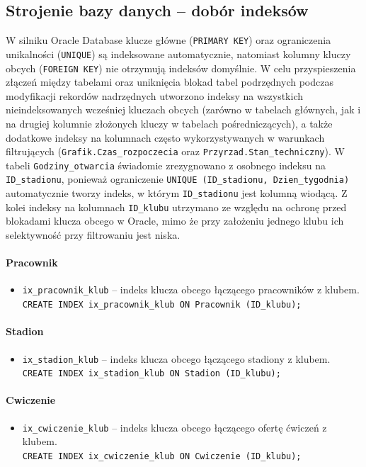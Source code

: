 \documentclass[11pt,a4paper]{article}
\begin{document}
\subsection{Strojenie bazy danych -- dobór indeksów}
W silniku Oracle Database klucze główne (\texttt{PRIMARY KEY}) oraz ograniczenia unikalności (\texttt{UNIQUE}) są indeksowane automatycznie, natomiast kolumny kluczy obcych (\texttt{FOREIGN KEY}) nie otrzymują indeksów domyślnie. W celu przyspieszenia złączeń między tabelami oraz uniknięcia blokad tabel podrzędnych podczas modyfikacji rekordów nadrzędnych utworzono indeksy na wszystkich nieindeksowanych wcześniej kluczach obcych (zarówno w tabelach głównych, jak i na drugiej kolumnie złożonych kluczy w tabelach pośredniczących), a także dodatkowe indeksy na kolumnach często wykorzystywanych w warunkach filtrujących (\texttt{Grafik.Czas\_rozpoczecia} oraz \texttt{Przyrzad.Stan\_techniczny}). W tabeli \texttt{Godziny\_otwarcia} świadomie zrezygnowano z osobnego indeksu na \texttt{ID\_stadionu}, ponieważ ograniczenie \texttt{UNIQUE (ID\_stadionu, Dzien\_tygodnia)} automatycznie tworzy indeks, w którym \texttt{ID\_stadionu} jest kolumną wiodącą. Z kolei indeksy na kolumnach \texttt{ID\_klubu} utrzymano ze względu na ochronę przed blokadami klucza obcego w Oracle, mimo że przy założeniu jednego klubu ich selektywność przy filtrowaniu jest niska.

\paragraph{Pracownik}
\begin{itemize}
    \item \texttt{ix\_pracownik\_klub} -- indeks klucza obcego łączącego pracowników z klubem.\\
    \texttt{CREATE INDEX ix\_pracownik\_klub ON Pracownik (ID\_klubu);}
\end{itemize}

\paragraph{Stadion}
\begin{itemize}
    \item \texttt{ix\_stadion\_klub} -- indeks klucza obcego łączącego stadiony z klubem.\\
    \texttt{CREATE INDEX ix\_stadion\_klub ON Stadion (ID\_klubu);}
\end{itemize}

\paragraph{Cwiczenie}
\begin{itemize}
    \item \texttt{ix\_cwiczenie\_klub} -- indeks klucza obcego łączącego ofertę ćwiczeń z klubem.\\
    \texttt{CREATE INDEX ix\_cwiczenie\_klub ON Cwiczenie (ID\_klubu);}
\end{itemize}
\end{document}
